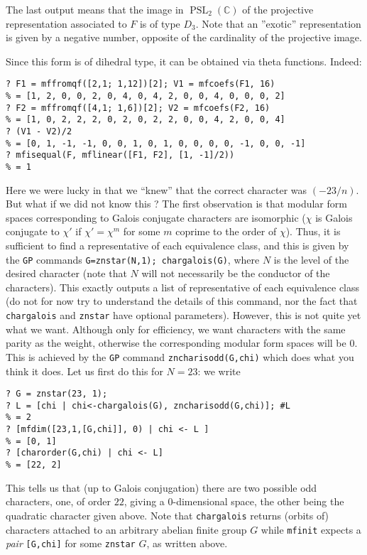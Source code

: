 \documentclass[11pt]{article}
\DeclareMathOperator{\PSL}{PSL}
\newcommand{\C}{{\mathbb C}}
\def\kbd#1{{\tt #1}}
\begin{document}
The last output means that the image in $\PSL_2(\C)$ of the projective
representation associated to $F$ is of type $D_3$. Note that an ''exotic''
representation is given by a negative number, opposite of the cardinality
of the projective image.

Since this form is of dihedral type, it can be obtained via theta functions.
Indeed:

\begin{verbatim}
? F1 = mffromqf([2,1; 1,12])[2]; V1 = mfcoefs(F1, 16)
% = [1, 2, 0, 0, 2, 0, 4, 0, 4, 2, 0, 0, 4, 0, 0, 0, 2]
? F2 = mffromqf([4,1; 1,6])[2]; V2 = mfcoefs(F2, 16)
% = [1, 0, 2, 2, 2, 0, 2, 0, 2, 2, 0, 0, 4, 2, 0, 0, 4]
? (V1 - V2)/2
% = [0, 1, -1, -1, 0, 0, 1, 0, 1, 0, 0, 0, 0, -1, 0, 0, -1]
? mfisequal(F, mflinear([F1, F2], [1, -1]/2))
% = 1
\end{verbatim}

Here we were lucky in that we ``knew'' that the correct character was
$(-23/n)$. But what if we did not know this ? The first observation is
that modular form spaces corresponding to Galois conjugate characters
are isomorphic ($\chi$ is Galois conjugate to $\chi'$ if $\chi'=\chi^m$
for some $m$ coprime to the order of $\chi$). Thus, it is sufficient
to find a representative of each equivalence class, and this is given by
the \kbd{GP} commands \kbd{G=znstar(N,1); chargalois(G)}, where $N$ is the
level of the desired character (note that $N$ will not necessarily be
the conductor of the characters). This exactly outputs a list of representative
of each equivalence class (do not for now try to understand the details of
this command, nor the fact that \kbd{chargalois} and \kbd{znstar} have
optional parameters). However, this is not quite yet what we want.
Although only for efficiency, we want characters with the same parity
as the weight, otherwise the corresponding modular form spaces will be $0$.
This is achieved by the \kbd{GP} command \kbd{zncharisodd(G,chi)} which
does what you think it does. Let us first do this for $N=23$: we write
\begin{verbatim}
? G = znstar(23, 1);
? L = [chi | chi<-chargalois(G), zncharisodd(G,chi)]; #L
% = 2
? [mfdim([23,1,[G,chi]], 0) | chi <- L ]
% = [0, 1]
? [charorder(G,chi) | chi <- L]
% = [22, 2]
\end{verbatim}

This tells us that (up to Galois conjugation) there are two possible odd
characters, one, of order $22$, giving a $0$-dimensional space, the other
being the quadratic character given above. Note that \kbd{chargalois}
returns (orbits of) characters attached to an arbitrary abelian finite group
$G$ while \kbd{mfinit} expects a \emph{pair} \kbd{[G,chi]} for some
\kbd{znstar} $G$, as written above.
\end{document}
